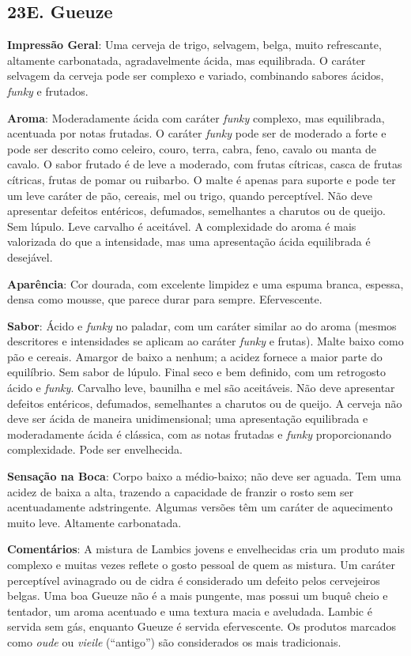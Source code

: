 \subsection*{23E. Gueuze}
\textbf{Impressão Geral}: Uma cerveja de trigo, selvagem, belga, muito refrescante, altamente carbonatada, agradavelmente ácida, mas equilibrada. O caráter selvagem da cerveja pode ser complexo e variado, combinando sabores ácidos, \textit{funky} e frutados.

\textbf{Aroma}: Moderadamente ácida com caráter \textit{funky} complexo, mas equilibrada, acentuada por notas frutadas. O caráter \textit{funky} pode ser de moderado a forte e pode ser descrito como celeiro, couro, terra, cabra, feno, cavalo ou manta de cavalo. O sabor frutado é de leve a moderado, com frutas cítricas, casca de frutas cítricas, frutas de pomar ou ruibarbo. O malte é apenas para suporte e pode ter um leve caráter de pão, cereais, mel ou trigo, quando perceptível. Não deve apresentar defeitos entéricos, defumados, semelhantes a charutos ou de queijo. Sem lúpulo. Leve carvalho é aceitável. A complexidade do aroma é mais valorizada do que a intensidade, mas uma apresentação ácida equilibrada é desejável.

\textbf{Aparência}: Cor dourada, com excelente limpidez e uma espuma branca, espessa, densa como mousse, que parece durar para sempre. Efervescente.

\textbf{Sabor}: Ácido e \textit{funky} no paladar, com um caráter similar ao do aroma (mesmos descritores e intensidades se aplicam ao caráter \textit{funky} e frutas). Malte baixo como pão e cereais. Amargor de baixo a nenhum; a acidez fornece a maior parte do equilíbrio. Sem sabor de lúpulo. Final seco e bem definido, com um retrogosto ácido e \textit{funky}. Carvalho leve, baunilha e mel são aceitáveis. Não deve apresentar defeitos entéricos, defumados, semelhantes a charutos ou de queijo. A cerveja não deve ser ácida de maneira unidimensional; uma apresentação equilibrada e moderadamente ácida é clássica, com as notas frutadas e \textit{funky} proporcionando complexidade. Pode ser envelhecida.

\textbf{Sensação na Boca}: Corpo baixo a médio-baixo; não deve ser aguada. Tem uma acidez de baixa a alta, trazendo a capacidade de franzir o rosto sem ser acentuadamente adstringente. Algumas versões têm um caráter de aquecimento muito leve. Altamente carbonatada.

\textbf{Comentários}: A mistura de Lambics jovens e envelhecidas cria um produto mais complexo e muitas vezes reflete o gosto pessoal de quem as mistura. Um caráter perceptível avinagrado ou de cidra é considerado um defeito pelos cervejeiros belgas. Uma boa Gueuze não é a mais pungente, mas possui um buquê cheio e tentador, um aroma acentuado e uma textura macia e aveludada. Lambic é servida sem gás, enquanto Gueuze é servida efervescente. Os produtos marcados como \textit{oude} ou \textit{vieile} (“antigo”) são considerados os mais tradicionais.

